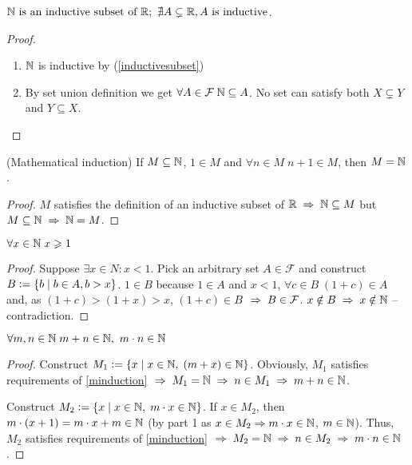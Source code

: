 \begin{theorem}
    $ \mathbb{N}\text{ is an inductive subset of } \mathbb{R};\ \nexists A \subsetneq \mathbb{R}, A \text{ is inductive}$.
\end{theorem}
\begin{proof}\phantom\\
    \begin{enumerate}
        \item $\mathbb{N}$ is inductive by (\ref{inductivesubset})
        \item By set union definition we get $\forall A \in \mathcal{F} \; \mathbb{N} \subseteq A$. No set can satisfy both $X \subsetneq Y$ and $Y \subseteq X$.
    \end{enumerate}
\end{proof}

\begin{theorem} (Mathematical induction)
    If $M \subseteq \mathbb{N}$, $1 \in M$ and $\forall n \in M \; n + 1 \in M$, then $M = \mathbb{N}$.
    \label{minduction}
\end{theorem}
\begin{proof}
    $M$ satisfies the definition of an inductive subset of $\mathbb{R} \;\Rightarrow\; \mathbb{N} \subseteq M$ but ${M \subseteq \mathbb{N}} \;\Rightarrow\; {\mathbb{N} = M}$.
\end{proof}

\begin{theorem}
    $ \forall x \in \mathbb{N} \; x \geqslant 1 $
\end{theorem}
\begin{proof}
    Suppose $\exists x \in N : x < 1$. Pick an arbitrary set $A \in \mathcal{F}$ and construct $B \vcentcolon= \{b \;\vert\; b \in A, b > x\}$. $1 \in B$ because $1 \in A$ and $x < 1$, $\forall c \in B \; (1 + c) \in A$ and, as $(1 + c) > (1 + x) > x$, $(1 + c) \in B$ $\;\Rightarrow\; B \in \mathcal{F}$. $x \notin B \;\Rightarrow\; x \notin \mathbb{N}$ -- contradiction.
\end{proof}

\begin{theorem}
    $ \forall m, n \in \mathbb{N} \; m + n \in \mathbb{N},\ m \cdot n \in \mathbb{N}$
\end{theorem}
\begin{proof}
    Construct $M_1 \vcentcolon= \{x \;\vert\; x \in \mathbb{N},\; (m + x) \in \mathbb{N}\}$. Obviously, $M_1$ satisfies requirements of \ref{minduction} $\;\Rightarrow\; M_1 = \mathbb{N} \;\Rightarrow\; n \in M_1 \;\Rightarrow\; m + n \in \mathbb{N}$.

    Construct $M_2 \vcentcolon= \{x \;\vert\; x \in \mathbb{N},\; m \cdot x \in \mathbb{N}\}$. If $x \in M_2$, then $m \cdot (x + 1) = m \cdot x + m \in \mathbb{N}$ (by part 1 as $x \in M_2 \Rightarrow m \cdot x \in \mathbb{N}$, $m \in \mathbb{N}$). Thus, $M_2$ satisfies requirements of \ref{minduction} $\;\Rightarrow\; M_2 = \mathbb{N} \;\Rightarrow\; n \in M_2 \;\Rightarrow\; m \cdot n \in \mathbb{N}$.
\end{proof}